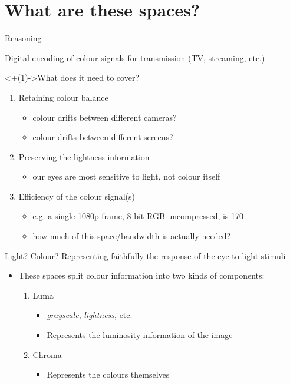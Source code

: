 \documentclass[aspectratio=169,handout,usepdftitle=false]{fireshonks}
\begin{document}
\section{What are these spaces?}
\begin{frame}{Reasoning}
    \begin{center}
        Digital encoding of colour signals for transmission (TV, streaming, etc.)
      \end{center}
    
      \uncover<+(1)->{What does it need to cover? \autocite{tooms}}
      \begin{enumerate}[<+(1)->]
        \item Retaining colour balance
              \begin{itemize}
                \item colour drifts between different cameras? 
                \item colour drifts between different screens? 
              \end{itemize}
        \item Preserving the lightness information
              \begin{itemize}
                \item our eyes are most sensitive to light, not colour itself
              \end{itemize}
        \item Efficiency of the colour signal(s)
              \begin{itemize}
                \item e.g. a single 1080p frame, 8-bit RGB uncompressed, is \SI{170}{\mega\byte}
                \item how much of this space/bandwidth is actually needed?
              \end{itemize}
      \end{enumerate}
\end{frame}
\begin{frame}{Light? Colour?}
    Representing faithfully the response of the eye to light stimuli

    \begin{itemize}
        \item These spaces split colour information into two kinds of components:
        \begin{enumerate}
            \item Luma
            \begin{itemize}
                \item \emph{grayscale}, \emph{lightness}, etc.
                \item Represents the luminosity information of the image
            \end{itemize}
            \item Chroma
            \begin{itemize}
                \item Represents the colours themselves
            \end{itemize}
        \end{enumerate}
    \end{itemize}
\end{frame}
\end{document}
